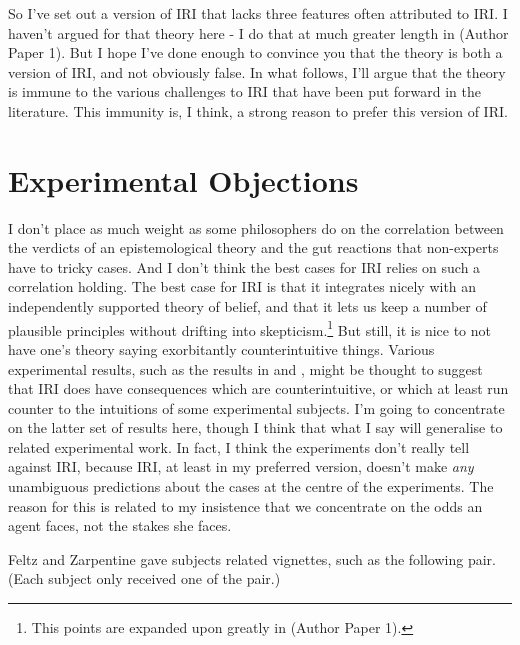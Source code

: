 \documentclass[oneside]{book}
\begin{document}
So I've set out a version of IRI that lacks three features often attributed to IRI. I haven't argued for that theory here - I do that at much greater length in (Author Paper 1). But I hope I've done enough to convince you that the theory is  both a version of IRI, and not obviously false. In what follows, I'll argue that the theory is immune to the various challenges to IRI that have been put forward in the literature. This immunity is, I think, a strong reason to prefer this version of IRI.

\section{Experimental Objections} \label{sect:xphi}
I don't place as much weight as some philosophers do on the correlation between the verdicts of an epistemological theory and the gut reactions that non-experts have to tricky cases. And I don't think the best cases for IRI relies on such a correlation holding. The best case for IRI is that it integrates nicely with an independently supported theory of belief, and that it lets us keep a number of plausible principles without drifting into skepticism.\footnote{This points are expanded upon greatly in (Author Paper 1).} But still, it is nice to not have one's theory saying exorbitantly counterintuitive things. Various experimental results, such as the results in \cite{May2010} and \cite{FeltzZarpentine2010}, might be thought to suggest that IRI does have consequences which are counterintuitive, or which at least run counter to the intuitions of some experimental subjects. I'm going to concentrate on the latter set of results here, though I think that what I say will generalise to related experimental work. In fact, I think the experiments don't really tell against IRI, because IRI, at least in my preferred version, doesn't make \textit{any} unambiguous predictions about the cases at the centre of the experiments. The reason for this is related to my insistence that we concentrate on the odds an agent faces, not the stakes she faces.

Feltz and Zarpentine gave subjects related vignettes, such as the following pair. (Each subject only received one of the pair.)
\end{document}

